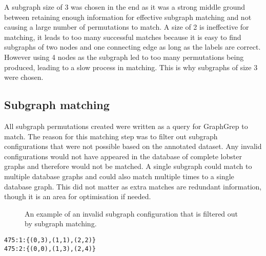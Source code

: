 \noindent
A subgraph size of 3 was chosen in the end as it was a strong middle ground between retaining enough information for effective subgraph matching and not causing a large number of permutations to match. A size of 2 is ineffective for matching, it leads to too many successful matches because it is easy to find subgraphs of two nodes and one connecting edge as long as the labels are correct. However using 4 nodes as the subgraph led to too many permutations being produced, leading to a slow process in matching. This is why subgraphs of size 3 were chosen.


\subsection{Subgraph matching}
All subgraph permutations created were written as a query for GraphGrep to match. The reason for this matching step was to filter out subgraph configurations that were not possible based on the annotated dataset. Any invalid configurations would not have appeared in the database of complete lobster graphs and therefore would not be matched. A single subgraph could match to multiple database graphs and could also match multiple times to a single database graph. This did not matter as extra matches are redundant information, though it is an area for optimisation if needed. 
\begin{figure}[H]
\centering
{}
\caption{An example of an invalid subgraph configuration that is filtered out by subgraph matching.}
\end{figure}

\begin{lstlisting}[caption={Example of matching output from GraphGrep, which specifies the graph ids that were matched and which node from the query corresponded to which node from the database graph.}]
475:1:{(0,3),(1,1),(2,2)}
475:2:{(0,0),(1,3),(2,4)}
\end{lstlisting}

